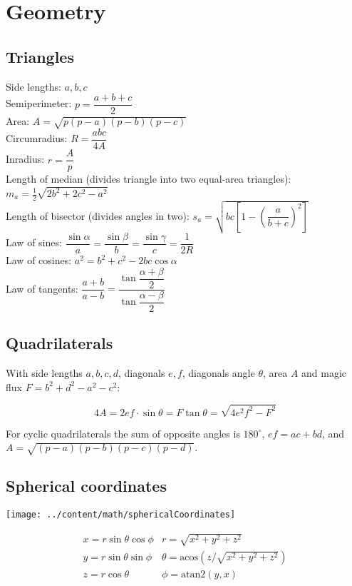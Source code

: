 	\section{Geometry}
							
	\subsection{Triangles}
	Side lengths: $a,b,c$\\
	Semiperimeter: $p=\dfrac{a+b+c}{2}$\\
	Area: $A=\sqrt{p(p-a)(p-b)(p-c)}$\\
	Circumradius: $R=\dfrac{abc}{4A}$\\
	Inradius: $r=\dfrac{A}{p}$\\
	Length of median (divides triangle into two equal-area triangles): $m_a=\tfrac{1}{2}\sqrt{2b^2+2c^2-a^2}$\\
	Length of bisector (divides angles in two): $s_a=\sqrt{bc\left[1-\left(\dfrac{a}{b+c}\right)^2\right]}$\\
	Law of sines: $\dfrac{\sin\alpha}{a}=\dfrac{\sin\beta}{b}=\dfrac{\sin\gamma}{c}=\dfrac{1}{2R}$\\
	Law of cosines: $a^2=b^2+c^2-2bc\cos\alpha$\\
	Law of tangents: $\dfrac{a+b}{a-b}=\dfrac{\tan\dfrac{\alpha+\beta}{2}}{\tan\dfrac{\alpha-\beta}{2}}$\\
							
	\subsection{Quadrilaterals}
	With side lengths $a,b,c,d$, diagonals $e, f$, diagonals angle $\theta$, area $A$ and
	magic flux $F=b^2+d^2-a^2-c^2$:
							
	\[ 4A = 2ef \cdot \sin\theta = F\tan\theta = \sqrt{4e^2f^2-F^2} \]
							
	For cyclic quadrilaterals the sum of opposite angles is $180^\circ$,
	$ef = ac + bd$, and $A = \sqrt{(p-a)(p-b)(p-c)(p-d)}$.
							
	\subsection{Spherical coordinates}
	\centerline{\texttt{[image: ../content/math/sphericalCoordinates]}}
	\[\begin{array}{cc}
		x = r\sin\theta\cos\phi & r = \sqrt{x^2+y^2+z^2}\\
		y = r\sin\theta\sin\phi & \theta = \textrm{acos}(z/\sqrt{x^2+y^2+z^2})\\
		z = r\cos\theta & \phi = \textrm{atan2}(y,x)
		\end{array}\]
														
